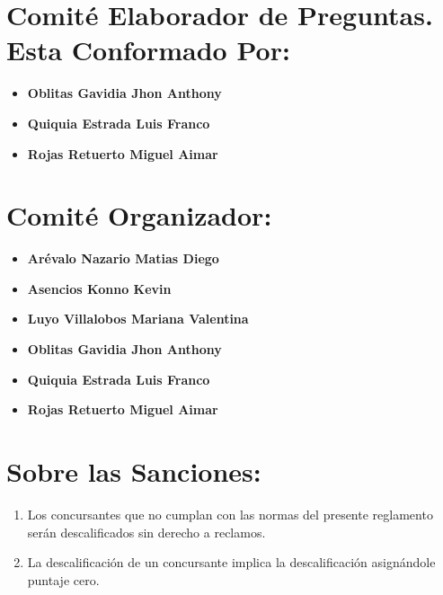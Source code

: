 \documentclass{article}
\begin{document}
\begin{itemize}
          \section{Comité Elaborador de Preguntas. Esta Conformado Por:}
          \begin{itemize}
              \item \textbf{Oblitas Gavidia Jhon Anthony}
              \item \textbf{Quiquia Estrada Luis Franco}
              \item \textbf{Rojas Retuerto Miguel Aimar}
          \end{itemize}
          \section{Comité Organizador:}
          \begin{itemize}
              \item \textbf{Arévalo Nazario Matias Diego}
              \item \textbf{Asencios Konno Kevin}
              \item \textbf{Luyo Villalobos Mariana Valentina}
              \item \textbf{Oblitas Gavidia Jhon Anthony}
              \item \textbf{Quiquia Estrada Luis Franco}
              \item \textbf{Rojas Retuerto Miguel Aimar}
          \end{itemize}
          \section{Sobre las Sanciones:}
          \begin{enumerate}
              \item Los concursantes que no cumplan con las normas del presente reglamento
                    serán descalificados sin derecho a reclamos.
              \item La descalificación de un concursante implica la descalificación asignándole
                    puntaje cero.
          \end{enumerate}

\end{itemize}
\end{document}
